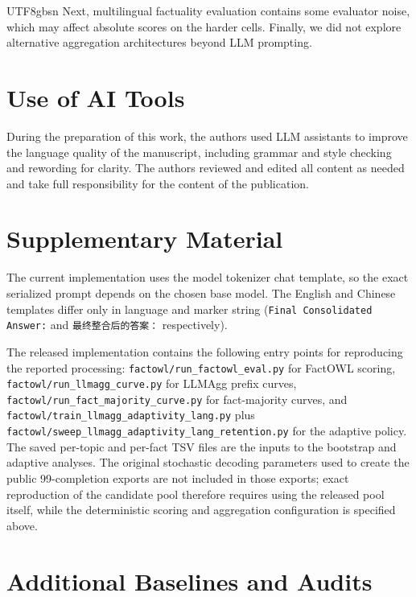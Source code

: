 \documentclass[11pt]{article}
\begin{document}
\begin{CJK*}{UTF8}{gbsn}
Next, multilingual factuality evaluation contains some evaluator noise, which may affect absolute scores on the harder cells. Finally, we did not explore alternative aggregation architectures beyond LLM prompting.

\section*{Use of AI Tools}

During the preparation of this work, the authors used LLM assistants to improve the language quality of the manuscript, including grammar and style checking and rewording for clarity. The authors reviewed and edited all content as needed and take full responsibility for the content of the publication.




\appendix
\section{Supplementary Material}

The current implementation uses the model tokenizer chat template, so the exact serialized prompt depends on the chosen base model. The English and Chinese templates differ only in language and marker string (\texttt{Final Consolidated Answer:} and \texttt{最终整合后的答案：} respectively).

The released implementation contains the following entry points for reproducing the reported processing: \texttt{factowl/run\_factowl\_eval.py} for FactOWL scoring, \texttt{factowl/run\_llmagg\_curve.py} for LLMAgg prefix curves, \texttt{factowl/run\_fact\_majority\_curve.py} for fact-majority curves, and \texttt{factowl/train\_llmagg\_adaptivity\_lang.py} plus \texttt{factowl/sweep\_llmagg\_adaptivity\_lang\_retention.py} for the adaptive policy. The saved per-topic and per-fact TSV files are the inputs to the bootstrap and adaptive analyses. The original stochastic decoding parameters used to create the public 99-completion exports are not included in those exports; exact reproduction of the candidate pool therefore requires using the released pool itself, while the deterministic scoring and aggregation configuration is specified above.

\section{Additional Baselines and Audits}
\label{app:baselines}


\end{CJK*}
\end{document}

